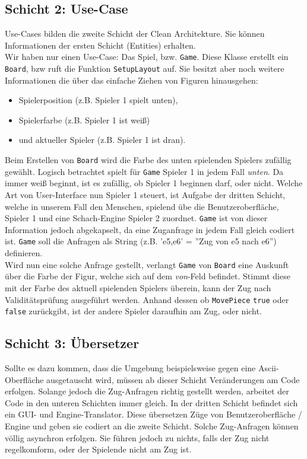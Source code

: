 \documentclass[
10pt, %
a4paper, %
oneside, %
headinclude,footinclude, %
BCOR5mm, %
]{scrartcl}
\begin{document}
\begin{onehalfspace}
\subsection{Schicht 2: Use-Case}
Use-Cases bilden die zweite Schicht der Clean Architekture. Sie können Informationen der ersten Schicht (Entities) erhalten.\\
Wir haben nur einen Use-Case: Das Spiel, bzw. \texttt{Game}. Diese Klasse erstellt ein \texttt{Board}, bzw ruft die Funktion \texttt{SetupLayout} auf. Sie besitzt aber noch weitere Informationen die über das einfache Ziehen von Figuren hinausgehen:
\begin{center}
	\begin{itemize}
		\item Spielerposition (z.B. Spieler 1 spielt unten),
		\item Spielerfarbe (z.B. Spieler 1 ist weiß)
		\item und aktueller Spieler (z.B. Spieler 1 ist dran).
	\end{itemize}
\end{center}
Beim Erstellen von \texttt{Board} wird die Farbe des unten spielenden Spielers zufällig gewählt. Logisch betrachtet spielt für \texttt{Game} Spieler 1 in jedem Fall \textit{unten}. Da immer weiß beginnt, ist es zufällig, ob Spieler 1 beginnen darf, oder nicht. Welche Art von User-Interface nun Spieler 1 steuert, ist Aufgabe der dritten Schicht, welche in unserem Fall den Menschen, spielend übe die Benutzeroberfläche, Spieler 1 und eine Schach-Engine Spieler 2 zuordnet. \texttt{Game} ist von dieser Information jedoch abgekapselt, da eine Zuganfrage in jedem Fall gleich codiert ist.
\texttt{Game} soll die Anfragen als String (z.B. 'e5,e6' = ''Zug von e5 nach e6'') definieren. \\
Wird nun eine solche Anfrage gestellt, verlangt \texttt{Game} von \texttt{Board} eine Auskunft über die Farbe der Figur, welche sich auf dem \textit{von}-Feld befindet. Stimmt diese mit der Farbe des aktuell spielenden Spielers überein, kann der Zug nach Validitätsprüfung ausgeführt werden. Anhand dessen ob \texttt{MovePiece} \texttt{true} oder \texttt{false} zurückgibt, ist der andere Spieler daraufhin am Zug, oder nicht.
\subsection{Schicht 3: Übersetzer}
Sollte es dazu kommen, dass die Umgebung beispielsweise gegen eine Ascii-Oberfläche ausgetauscht wird, müssen ab dieser Schicht Veränderungen am Code erfolgen. Solange jedoch die Zug-Anfragen richtig gestellt werden, arbeitet der Code in den unteren Schichten immer gleich. In der dritten Schicht befindet sich ein GUI- und Engine-Translator. Diese übersetzen Züge von Benutzeroberfläche / Engine und geben sie codiert an die zweite Schicht. 
Solche Zug-Anfragen können völlig asynchron erfolgen. Sie führen jedoch zu nichts, falls der Zug nicht regelkomform, oder der Spielende nicht am Zug ist.

\end{onehalfspace}
\end{document}
